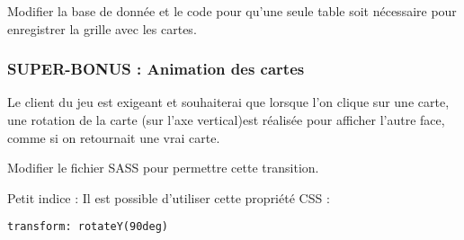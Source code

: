 \documentclass[a4paper,french,12pt]{article}
\begin{document}
Modifier la base de donnée et le code pour qu'une seule table soit nécessaire pour enregistrer la grille avec les cartes.

\subsubsection{SUPER-BONUS : Animation des cartes}
Le client du jeu est exigeant et souhaiterai que lorsque l'on clique sur une carte, une rotation de la carte (sur l'axe vertical)est réalisée pour afficher l'autre face, comme si on retournait une vrai carte.

Modifier le fichier SASS pour permettre cette transition.

Petit indice : Il est possible d'utiliser cette propriété CSS : 
\begin{verbatim}
transform: rotateY(90deg)
\end{verbatim}
\end{document}
